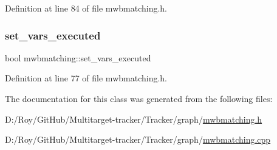 Definition at line 84 of file mwbmatching.\+h.

\mbox{\label{classmwbmatching_ae871c52302b78ccf16a271ef099e0a3a}} 
\subsubsection{\texorpdfstring{set\+\_\+vars\+\_\+executed}{set\_vars\_executed}}
{\footnotesize\ttfamily bool mwbmatching\+::set\+\_\+vars\+\_\+executed\hspace{0.3cm}{\ttfamily [protected]}}



Definition at line 77 of file mwbmatching.\+h.



The documentation for this class was generated from the following files\+:\begin{DoxyCompactItemize}
\item 
D\+:/\+Roy/\+Git\+Hub/\+Multitarget-\/tracker/\+Tracker/graph/\mbox{\hyperlink{mwbmatching_8h}{mwbmatching.\+h}}\item 
D\+:/\+Roy/\+Git\+Hub/\+Multitarget-\/tracker/\+Tracker/graph/\mbox{\hyperlink{mwbmatching_8cpp}{mwbmatching.\+cpp}}\end{DoxyCompactItemize}
